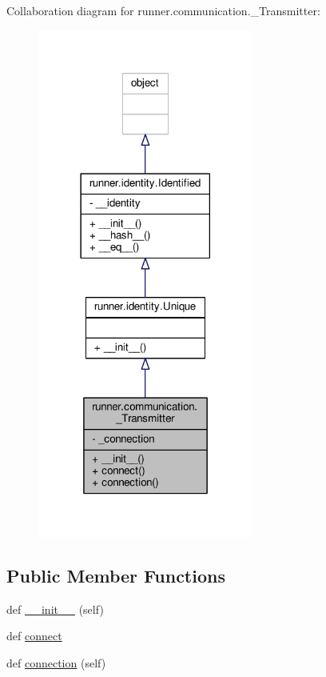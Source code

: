 Collaboration diagram for runner.\+communication.\+\_\+\+Transmitter\+:
\nopagebreak
\begin{figure}[H]
\begin{center}
\leavevmode
\includegraphics[width=201pt]{classrunner_1_1communication_1_1__Transmitter__coll__graph}
\end{center}
\end{figure}
\subsection*{Public Member Functions}
\begin{DoxyCompactItemize}
\item 
def \hyperlink{classrunner_1_1communication_1_1__Transmitter_aa176b9fd3b6dec2baae5814ce3ed5884}{\+\_\+\+\_\+init\+\_\+\+\_\+} (self)
\item 
def \hyperlink{classrunner_1_1communication_1_1__Transmitter_a535caf9b469e0665ea146a02136719b8}{connect}
\item 
def \hyperlink{classrunner_1_1communication_1_1__Transmitter_a3aade0da93d3fedb18bec5c5f90a4dd3}{connection} (self)
\end{DoxyCompactItemize}
